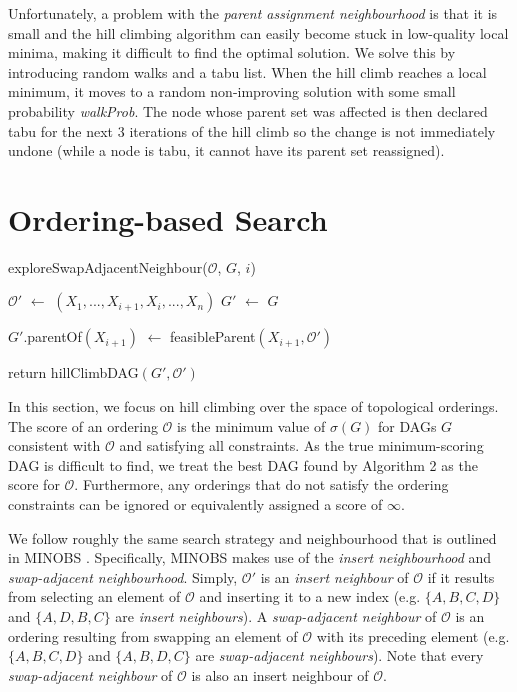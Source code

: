 \documentclass[twoside,11pt]{article}
\begin{document}
\medskip
Unfortunately, a problem with the \emph{parent assignment neighbourhood} is that it is small and the hill climbing algorithm can easily become stuck in low-quality 
local minima, making it difficult to find the optimal solution. We solve this by introducing random walks and a tabu list. When the hill climb reaches a local minimum, it moves 
to a random non-improving solution with some small probability \emph{walkProb}. The node whose parent set was affected is then declared tabu for the next 3 iterations of the hill climb
so the change is not immediately undone (while a node is tabu, it cannot have its parent set reassigned).

\section{Ordering-based Search}
\begin{algorithm}[t]
	\caption{exploreSwapAdjacentNeighbour($\mathcal{O}$, $G$, $i$)}
		$\mathcal{O}'$ $\leftarrow$ $(X_1, ..., X_{i+1}, X_i, ..., X_n)$ \;
		$G'$ $\leftarrow$ $G$ 
		
		 {
			$G'$.parentOf$(X_{i+1})$ $\leftarrow$ feasibleParent$(X_{i+1}, \mathcal{O'})$ \;
		}
		
		return hillClimbDAG$(G', \mathcal{O}')$ \;
\end{algorithm} 

In this section, we focus on hill climbing over the space of topological orderings. The score of an ordering $\mathcal{O}$ is the minimum value of $\sigma(G)$
for DAGs $G$ consistent with $\mathcal{O}$ and satisfying all constraints. As the true minimum-scoring DAG is difficult to find, we treat the best DAG found by
Algorithm 2 as the score for $\mathcal{O}$. Furthermore, any orderings that do not satisfy the ordering constraints can be ignored or equivalently
assigned a score of $\infty$. 

\medskip
We follow roughly the same search strategy and neighbourhood that is outlined in MINOBS 
\citep{Lee2017}. Specifically, MINOBS makes use of the \emph{insert neighbourhood} and \emph{swap-adjacent neighbourhood}. Simply, $\mathcal{O'}$ is an 
\emph{insert neighbour} of $\mathcal{O}$ if it results from selecting an element of $\mathcal{O}$ and inserting it to a new index (e.g. $\{A,B,C,D\}$ and $\{A,D,B,C\}$
are \emph{insert neighbours}). A \emph{swap-adjacent neighbour} of $\mathcal{O}$ is an ordering resulting from swapping an element of $\mathcal{O}$ with its preceding element 
(e.g. $\{A,B,C,D\}$ and $\{A,B,D,C\}$ are \emph{swap-adjacent neighbours}). Note that every \emph{swap-adjacent neighbour} of $\mathcal{O}$ is also an insert neighbour of $\mathcal{O}$. 
\end{document}
